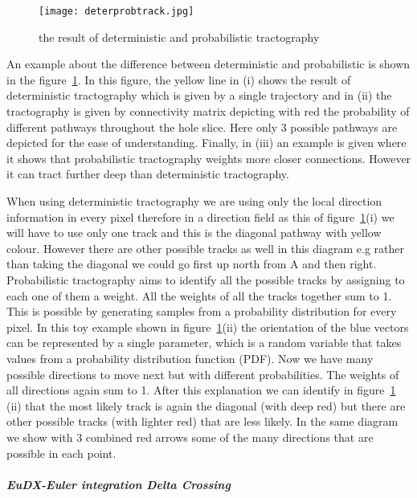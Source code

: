 \begin{figure} 
  \centering 
  \texttt{[image: deterprobtrack.jpg]}
  \caption{the result of deterministic and probabilistic tractography}
  \label{Fig:deterprobtrack}
\end{figure}

An example about the difference between deterministic and probabilistic is shown in the figure~\ref{Fig:deterprobtrack}. In this figure, the yellow line in (i) shows the result of deterministic tractography which is given by a single trajectory and in (ii) the tractography is given by connectivity matrix depicting with red the probability of different pathways throughout the hole slice. Here only 3 possible pathways are depicted for the ease of understanding. Finally, in (iii) an example is given where it shows that probabilistic tractography weights more closer connections. However it can tract further deep than deterministic tractography. 

When using deterministic tractography we are using only the local direction information in every pixel therefore in a direction field as this of figure~\ref{Fig:deterprobtrack}(i) we will have to use only one track and this is the diagonal pathway with yellow colour. However there are other possible tracks as well in this diagram e.g rather than taking the diagonal we could go first up north from A and then right. Probabilistic tractography aims to identify all the possible tracks by assigning to each one of them a weight. All the weights of all the tracks together sum to 1. This is possible by generating samples from a probability distribution for every pixel. In this toy example shown in figure~\ref{Fig:deterprobtrack}(ii) the orientation of the blue vectors can be represented by a single parameter, which is a random variable that takes values from a probability distribution function (PDF). Now we have many possible directions to move next but with different probabilities. The weights of all directions again sum to 1. After this explanation we can identify in figure~\ref{Fig:deterprobtrack} (ii) that the most likely track is again the diagonal (with deep red) but there are other possible tracks (with lighter red) that are less likely. In the same diagram we show with 3 combined red arrows some of the many directions that are possible in each point.

\subparagraph{EuDX-Euler integration Delta Crossing}


